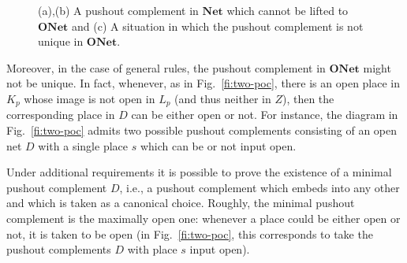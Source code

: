 \documentclass{LMCS}
\newcommand{\onet}{\ensuremath{\mathbf{ONet}}}
\newcommand{\net}{\ensuremath{\mathbf{Net}}}
\begin{document}
\begin{figure}[t]
  \centering
  \hspace{5mm}
  \hspace{5mm}

\caption{(a),(b) A pushout complement in $\net$ which cannot be lifted to
  $\onet$ and (c) A situation in which the pushout complement is not
  unique in $\onet$.}

\end{figure}

Moreover, in the case of general rules, the pushout complement in
$\onet$ might not be unique. In fact, whenever, as in
Fig.~\ref{fi:two-poc}, there is an open place in $K_p$ whose image is
not open in $L_p$ (and thus neither in $Z$), then the corresponding
place in $D$ can be either open or not. For instance, the diagram in
Fig.~\ref{fi:two-poc} admits two possible pushout complements
consisting of an open net $D$ with a single place $s$ which can be or
not input open.

Under additional requirements it is possible to prove the existence of
a minimal pushout complement $D$, i.e., a pushout complement which
embeds into any other and which is taken as a canonical
choice. Roughly, the minimal pushout complement is the maximally open
one: whenever a place could be either open or not, it is taken to be
open (in Fig.~\ref{fi:two-poc}, this corresponds to take the pushout
complements $D$ with place $s$ input open).
\end{document}
